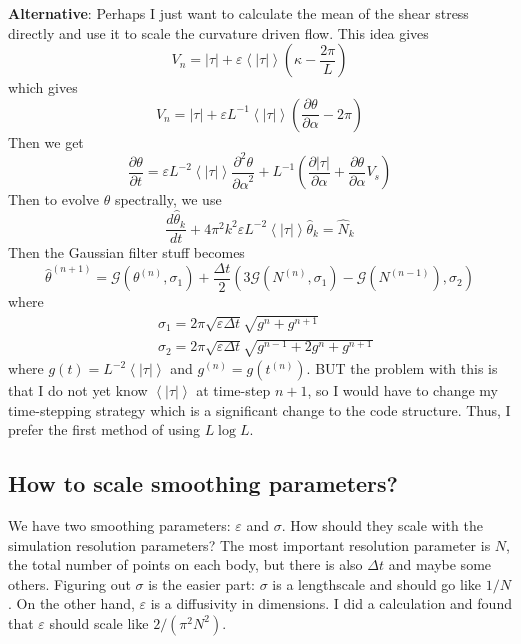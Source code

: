\documentclass[11pt]{article}
\newcommand{\vsp}[1]{\vspace{#1 pc} \noindent}
\newcommand{\pd}[2]    { \frac{\partial #1} {\partial #2} }
\newcommand{\ppd}[2]  { \frac{\partial^2 #1}{{\partial #2}^2} }
\newcommand{\td}[2] { \frac{d #1} { d #2 } }
\newcommand{\abs}[1]{\left| #1 \right|}
\newcommand{\mean}[1]{\left< #1 \right>}
\newcommand{\eps}{\varepsilon}
\newcommand{\atau}{\abs{\tau}}
\newcommand{\thh}{\hat{\theta}}
\newcommand{\GG}{\mathcal{G}}
\newcommand{\Dt}{\Delta t}
\begin{document}
\vsp{2}
{\bf  Alternative}: Perhaps I just want to calculate the mean of the shear stress directly and use it to scale the curvature driven flow. This idea gives
\begin{equation}
V_n = \atau + \eps \mean{\atau} \left(\kappa - \frac{2 \pi}{L} \right)
\end{equation}
which gives
\begin{equation}
V_n = \atau + \eps L^{-1} \mean{\atau} \left(\pd{\theta}{\alpha} - 2 \pi \right)
\end{equation}
Then we get
\begin{equation}
\pd{\theta}{t} = \eps L^{-2} \mean{\atau} \ppd{\theta}{\alpha} + L^{-1} \left( \pd{\atau}{\alpha} + \pd{\theta}{\alpha} V_s \right)
\end{equation}
Then to evolve $\theta$ spectrally, we use
\begin{equation}
\td{\thh_k}{t} + 4 \pi^2 k^2 \eps L^{-2} \mean{\atau}  \thh_k = \hat{N}_k
\end{equation}
Then the Gaussian filter stuff becomes
\begin{equation}
\label{intfact}
\thh^{(n+1)} = \GG(\theta^{(n)}, \sigma_1) 
+ \frac{\Dt}{2} \left( 3 \GG(N^{(n)}, \sigma_1) - \GG(N^{(n-1)}), \sigma_2 \right)
\end{equation}
where
\begin{align}
& \sigma_1 = 2 \pi \sqrt{\eps \Dt} \sqrt{g^{n} + g^{n+1} } 	\\
& \sigma_2 = 2 \pi \sqrt{\eps \Dt} \sqrt{g^{n-1} + 2 g^{n} + g^{n+1} }
\end{align}
where $g(t)= L^{-2} \mean{\atau}$ and $g^{(n)} = g(t^{(n)})$.
BUT the problem with this is that I do not yet know $\mean{\atau}$ at time-step $n+1$, so I would have to change my time-stepping strategy which is a significant change to the code structure. Thus, I prefer the first method of using $L \log L$.


\subsection{How to scale smoothing parameters?}
We have two smoothing parameters: $\eps$ and $\sigma$. How should they scale with the simulation resolution parameters? The most important resolution parameter is $N$, the total number of points on each body, but there is also $\Delta t$ and maybe some others. Figuring out $\sigma$ is the easier part: $\sigma$ is a lengthscale and should go like $1/N$. On the other hand, $\eps$ is a diffusivity in dimensions. I did a calculation and found that $\eps$ should scale like $2/(\pi^2 N^2)$.
\end{document}
